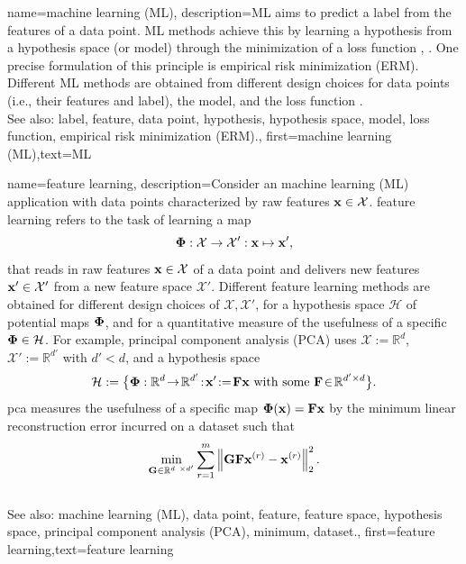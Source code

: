 {name={machine learning (ML)},
		 description={ML aims to predict 
	 a label from the features of a data point. ML methods achieve 
	 this by learning a hypothesis from a hypothesis space (or model) 
	 through the minimization of a loss function \cite{MLBasics}, \cite{HastieWainwrightBook}. 
	 One precise formulation of this principle is empirical risk minimization (ERM). Different ML methods are 
	 obtained from different design choices for data points (i.e., their features and label), 
	 the model, and the loss function \cite[Ch. 3]{MLBasics}.
	 			\\ 
		See also: label, feature, data point, hypothesis, hypothesis space, model, loss function, empirical risk minimization (ERM).},
	first={machine learning (ML)},text={ML}
} 


{name={feature learning},
	description={Consider an machine learning (ML) application with data points characterized by 
		raw features ${\bf x} \in \mathcal{X}$. \Gls{feature} learning 
		refers to the task of learning a map 
		$${\bf \Phi}: \mathcal{X} \rightarrow \mathcal{X}': {\bf x} \mapsto {\bf x}',$$ 
		that reads in raw features ${\bf x} \in \mathcal{X}$ of a data point and delivers new 
		features ${\bf x}' \in \mathcal{X}'$ from a new feature space $\mathcal{X}'$. 
		Different feature learning methods are obtained for different design 
		choices of $\mathcal{X},\mathcal{X}'$, for a hypothesis space $\mathcal{H}$ 
		of potential maps ${\bf \Phi}$, and for a quantitative measure of the usefulness of 
		a specific ${\bf \Phi} \in \mathcal{H}$. For example, principal component analysis (PCA) 
		uses $\mathcal{X} := \mathbb{R}^{d}$, $\mathcal{X}' := \mathbb{R}^{d'}$ 
		with $d' < d$, and a hypothesis space 
		$$\mathcal{H}:= \big\{ {\bf \Phi}: \mathbb{R}^{d}
		\!\rightarrow\! \mathbb{R}^{d'}\!:\!{\bf x}'\!:=\!\mathbf{F} {\bf x} \mbox{ with some } \mathbf{F} \!\in\! \mathbb{R}^{d' \times d} \big\}.$$ \Gls{pca} measures the usefulness of a specific map ${\bf \Phi}({\bf x})= \mathbf{F} {\bf x}$ 
	by the minimum linear reconstruction error incurred on a dataset such that 
$$ \min_{\mathbf{G} \in \mathbb{R}^{d \times d'}} \sum_{r=1}^{m} \left\Vert  {\mathbf{G} \mathbf{F} {\bf x}^{(r)} - {\bf x}^{(r)}} \right\Vert_{2}^{2}.$$ 
			\\ 
		See also: machine learning (ML), data point, feature, feature space, hypothesis space, principal component analysis (PCA), minimum, dataset.}, 
	first={feature learning},text={feature learning}
} 

